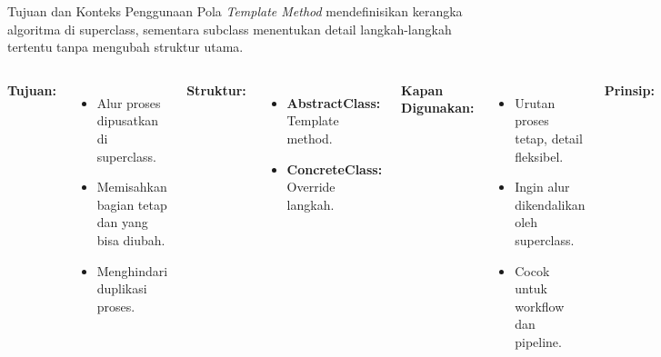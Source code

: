 \documentclass[aspectratio=169, table]{beamer}
\begin{document}
\begin{frame}{Tujuan dan Konteks Penggunaan}
	\vspace{10pt}
	Pola \textit{Template Method} mendefinisikan kerangka algoritma di superclass, sementara subclass menentukan detail langkah-langkah tertentu tanpa mengubah struktur utama.
	
	\vspace{6pt}
	\begin{columns}[T]
		\textbf{Tujuan:}
		\begin{itemize}
			\item Alur proses dipusatkan di superclass.
			\item Memisahkan bagian tetap dan yang bisa diubah.
			\item Menghindari duplikasi proses.
		\end{itemize}
		
		\textbf{Struktur:}
		\begin{itemize}
			\item \textbf{AbstractClass:} Template method.
			\item \textbf{ConcreteClass:} Override langkah.
		\end{itemize}
		
		\textbf{Kapan Digunakan:}
		\begin{itemize}
			\item Urutan proses tetap, detail fleksibel.
			\item Ingin alur dikendalikan oleh superclass.
			\item Cocok untuk workflow dan pipeline.
		\end{itemize}
		
		\textbf{Prinsip:}
		\begin{itemize}
			\item \textit{Hollywood Principle}: "Don't call us, we'll call you."
		\end{itemize}
	\end{columns}
\end{frame}
\end{document}
